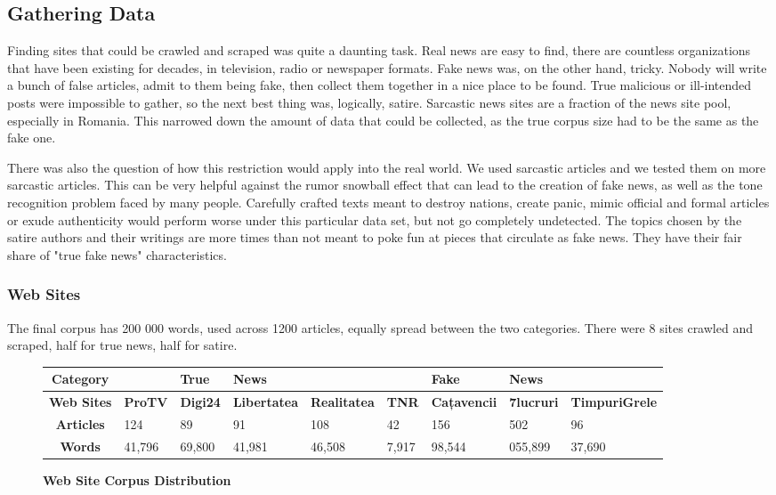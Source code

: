 \documentclass{article}
\begin{document}
	\subsection{Gathering Data}
	Finding sites that could be crawled and scraped was quite a daunting task. Real news are easy to find, there are countless organizations that have been existing for decades, in television, radio or newspaper formats. Fake news was, on the other hand, tricky. Nobody will write a bunch of false articles, admit to them being fake, then collect them together in a nice place to be found. True malicious or ill-intended posts were impossible to gather, so the next best thing was, logically, satire. Sarcastic news sites are a fraction of the news site pool, especially in Romania. This narrowed down the amount of data that could be collected, as the true corpus size had to be the same as the fake one. 
	\par There was also the question of how this restriction would apply into the real world. We used sarcastic articles and we tested them on more sarcastic articles. This can be very helpful against the rumor snowball effect that can lead to the creation of fake news, as well as the tone recognition problem faced by many people. Carefully crafted texts meant to destroy nations, create panic, mimic official and formal articles or exude authenticity would perform worse under this particular data set, but not go completely undetected. The topics chosen by the satire authors and their writings are more times than not meant to poke fun at pieces that circulate as fake news. They have their fair share of "true fake news" characteristics.

	\subsubsection{Web Sites}
	 The final corpus has 200 000 words, used across 1200 articles, equally spread between the two categories. There were 8 sites crawled and scraped, half for true news, half for satire.
	\begin{figure}[!h]
		\begin{tabular}{||c||l|l|l|l||l|l|l|l|||}
			\hline
			\textbf{Category} &  & \textbf{True} & \textbf{News}& & &\textbf{Fake} & \textbf{News} &  \\ \hline 
			\textbf{Web Sites} & \textbf{ProTV} & \textbf{Digi24} & \textbf{Libertatea} & \textbf{Realitatea} &\textbf{TNR} & \textbf{Cațavencii} & \textbf{7lucruri} & \textbf{TimpuriGrele} \\ \hline
			\textbf{Articles} & 124 &89 &91 & 108 &42 & 156 &502 & 96  \\ \hline 
			\textbf{Words} & 41,796 & 69,800 & 41,981 & 46,508 & 7,917 & 98,544 & 055,899 &37,690  \\ \hline 
		\end{tabular}
		\caption{\textbf{Web Site Corpus Distribution}}
	\end{figure} 
\end{document}
